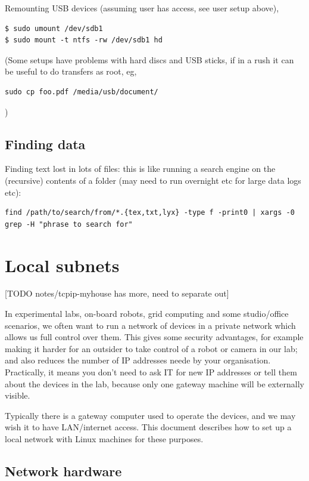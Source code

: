 \documentclass[oneside,english]{scrbook}
\begin{document}
Remounting USB devices (assuming user has access, see user setup above),
\begin{lstlisting}
$ sudo umount /dev/sdb1
$ sudo mount -t ntfs -rw /dev/sdb1 hd
\end{lstlisting}

(Some setups have problems with hard discs and USB sticks, if in a rush it can be useful to do transfers as root, eg, 
\begin{lstlisting}
sudo cp foo.pdf /media/usb/document/
\end{lstlisting}
)

\section{Finding data}
Finding text lost in lots of files: this is like running a search engine on the (recursive) contents of a folder (may need to run overnight etc for large data logs etc):
\begin{lstlisting}
find /path/to/search/from/*.{tex,txt,lyx} -type f -print0 | xargs -0 grep -H "phrase to search for"
\end{lstlisting}

\chapter{Local subnets}

[TODO notes/tcpip-myhouse has more, need to separate out]


In experimental labs, on-board robots, grid computing and some studio/office scenarios, we
often want to run a network of devices in a private network which
allows us full control over them.  This gives some security advantages, for example making it harder for an outsider to take control of a robot or camera in our lab; and also reduces the number of IP addresses neede by your organisation. Practically, it means you don't need to ask IT for new IP addresses or tell them about the devices in the lab, because only one gateway machine will be externally visible.

Typically there is a gateway computer
used to operate the devices, and we may wish
it to have LAN/internet access. This document describes how to set up
a local network with Linux machines for these purposes.


\section{Network hardware}
\end{document}

